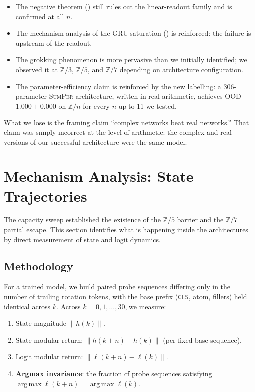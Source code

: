 \documentclass[11pt]{article}
\theoremstyle{definition}
\newcommand{\Z}{\mathbb{Z}}
\DeclareMathOperator*{\argmax}{arg\,max}
\begin{document}
\begin{itemize}[itemsep=2pt]
\item The negative theorem () still
rules out the linear-readout family and is confirmed at all $n$.
\item The mechanism analysis of the GRU saturation
() is reinforced: the failure is upstream of
the readout.
\item The grokking phenomenon is more pervasive than we initially
identified; we observed it at $\Z/3$, $\Z/5$, and $\Z/7$ depending
on architecture configuration.
\item The parameter-efficiency claim is reinforced by the new
labelling: a 306-parameter \textsc{SumPer} architecture, written
in real arithmetic, achieves OOD $1.000 \pm 0.000$ on $\Z/n$ for
every $n$ up to 11 we tested.
\end{itemize}

What we lose is the framing claim ``complex networks beat real
networks.'' That claim was simply incorrect at the level of
arithmetic: the complex and real versions of our successful
architecture were the same model.


\section{Mechanism Analysis: State Trajectories}
\label{sec:mechanism}

The capacity sweep established the existence of the $\Z/5$ barrier
and the $\Z/7$ partial escape. This section identifies what is
happening inside the architectures by direct measurement of state
and logit dynamics.

\subsection{Methodology}

For a trained model, we build paired probe sequences differing only
in the number of trailing rotation tokens, with the base prefix
(\texttt{CLS}, atom, fillers) held identical across $k$. Across
$k = 0, 1, \ldots, 30$, we measure:
\begin{enumerate}[itemsep=2pt]
\item State magnitude $\|h(k)\|$.
\item State modular return: $\|h(k+n) - h(k)\|$ (per fixed base
sequence).
\item Logit modular return: $\|\ell(k+n) - \ell(k)\|$.
\item \textbf{Argmax invariance}: the fraction of probe sequences
satisfying $\argmax \ell(k+n) = \argmax \ell(k)$.
\end{enumerate}
\end{document}
